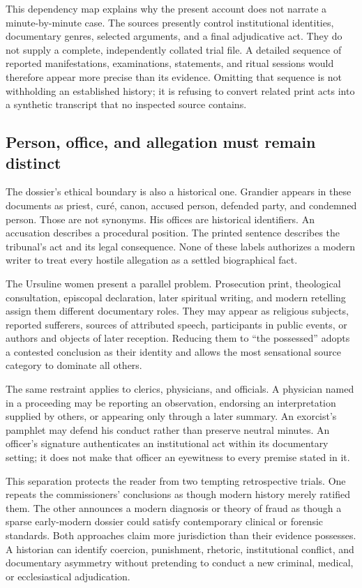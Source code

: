 This dependency map explains why the present account does not narrate a
minute-by-minute case.  The sources presently control institutional identities,
documentary genres, selected arguments, and a final adjudicative act.  They do
not supply a complete, independently collated trial file.  A detailed sequence
of reported manifestations, examinations, statements, and ritual sessions
would therefore appear more precise than its evidence.  Omitting that sequence
is not withholding an established history; it is refusing to convert related
print acts into a synthetic transcript that no inspected source contains.

\subsection{Person, office, and allegation must remain distinct}

The dossier's ethical boundary is also a historical one.  Grandier appears in
these documents as priest, curé, canon, accused person, defended party, and
condemned person.  Those are not synonyms.  His offices are historical
identifiers.  An accusation describes a procedural position.  The printed
sentence describes the tribunal's act and its legal consequence.  None of
these labels authorizes a modern writer to treat every hostile allegation as a
settled biographical fact.

The Ursuline women present a parallel problem.  Prosecution print, theological
consultation, episcopal declaration, later spiritual writing, and modern
retelling assign them different documentary roles.  They may appear as
religious subjects, reported sufferers, sources of attributed speech,
participants in public events, or authors and objects of later reception.
Reducing them to ``the possessed'' adopts a contested conclusion as their
identity and allows the most sensational source category to dominate all
others.

The same restraint applies to clerics, physicians, and officials.  A physician
named in a proceeding may be reporting an observation, endorsing an
interpretation supplied by others, or appearing only through a later summary.
An exorcist's pamphlet may defend his conduct rather than preserve neutral
minutes.  An officer's signature authenticates an institutional act within its
documentary setting; it does not make that officer an eyewitness to every
premise stated in it.

This separation protects the reader from two tempting retrospective trials.
One repeats the commissioners' conclusions as though modern history merely
ratified them.  The other announces a modern diagnosis or theory of fraud as
though a sparse early-modern dossier could satisfy contemporary clinical or
forensic standards.  Both approaches claim more jurisdiction than their
evidence possesses.  A historian can identify coercion, punishment, rhetoric,
institutional conflict, and documentary asymmetry without pretending to
conduct a new criminal, medical, or ecclesiastical adjudication.

